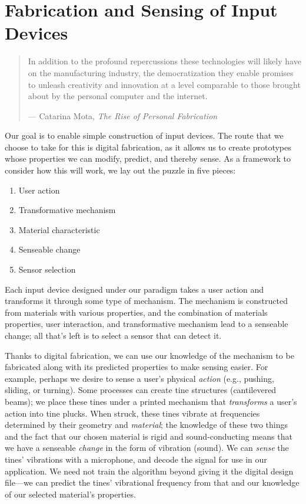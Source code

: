 \chapter{Fabrication and Sensing of Input Devices}


\begin{quote}
In addition to the profound repercussions these technologies
will likely have on the manufacturing industry, the
democratization they enable promises to unleash creativity
and innovation at a level comparable to those brought about
by the personal computer and the internet.

--- Catarina Mota, \emph{The Rise of Personal Fabrication}\cite{mota-riseof}
\end{quote}

Our goal is to enable simple construction of input devices. The route that we choose to take for this is digital fabrication, as it allows us to create prototypes whose properties we can modify, predict, and thereby sense. As a framework to consider how this will work, we lay out the puzzle in five pieces:

\begin{enumerate}
    \item User action
    \item Transformative mechanism
    \item Material characteristic
    \item Senseable change
    \item Sensor selection
\end{enumerate}

Each input device designed under our paradigm takes a user action and transforms it through some type of mechanism. The mechanism is constructed from materials with various properties, and the combination of materials properties, user interaction, and transformative mechanism lead to a senseable change; all that's left is to select a sensor that can detect it.

Thanks to digital fabrication, we can use our knowledge of the mechanism to be fabricated along with its predicted properties to make sensing easier. For example, perhaps we desire to sense a user's physical \emph{action} (e.g., pushing, sliding, or turning). Some processes can create tine structures (cantilevered beams); we place these tines under a printed mechanism that \emph{transforms} a user's action into tine plucks. When struck, these tines vibrate at frequencies determined by their geometry and \emph{material}; the knowledge of these two things and the fact that our chosen material is rigid and sound-conducting means that we have a senseable \emph{change} in the form of vibration (sound). We can \emph{sense} the tines' vibrations with a microphone, and decode the signal for use in our application. We need not train the algorithm beyond giving it the digital design file---we can predict the tines' vibrational frequency from that and our knowledge of our selected material's properties.

